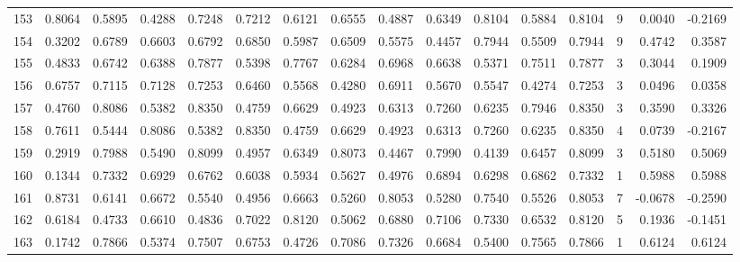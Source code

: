 \begin{tabular}{lrrrrrrrrrrrrrrr}
153 &      0.8064 &  0.5895 &  0.4288 &  0.7248 &  0.7212 &  0.6121 &  0.6555 &  0.4887 &  0.6349 &  0.8104 &   0.5884 &     0.8104 &      9 &                    0.0040 &                    -0.2169 \\
154 &      0.3202 &  0.6789 &  0.6603 &  0.6792 &  0.6850 &  0.5987 &  0.6509 &  0.5575 &  0.4457 &  0.7944 &   0.5509 &     0.7944 &      9 &                    0.4742 &                     0.3587 \\
155 &      0.4833 &  0.6742 &  0.6388 &  0.7877 &  0.5398 &  0.7767 &  0.6284 &  0.6968 &  0.6638 &  0.5371 &   0.7511 &     0.7877 &      3 &                    0.3044 &                     0.1909 \\
156 &      0.6757 &  0.7115 &  0.7128 &  0.7253 &  0.6460 &  0.5568 &  0.4280 &  0.6911 &  0.5670 &  0.5547 &   0.4274 &     0.7253 &      3 &                    0.0496 &                     0.0358 \\
157 &      0.4760 &  0.8086 &  0.5382 &  0.8350 &  0.4759 &  0.6629 &  0.4923 &  0.6313 &  0.7260 &  0.6235 &   0.7946 &     0.8350 &      3 &                    0.3590 &                     0.3326 \\
158 &      0.7611 &  0.5444 &  0.8086 &  0.5382 &  0.8350 &  0.4759 &  0.6629 &  0.4923 &  0.6313 &  0.7260 &   0.6235 &     0.8350 &      4 &                    0.0739 &                    -0.2167 \\
159 &      0.2919 &  0.7988 &  0.5490 &  0.8099 &  0.4957 &  0.6349 &  0.8073 &  0.4467 &  0.7990 &  0.4139 &   0.6457 &     0.8099 &      3 &                    0.5180 &                     0.5069 \\
160 &      0.1344 &  0.7332 &  0.6929 &  0.6762 &  0.6038 &  0.5934 &  0.5627 &  0.4976 &  0.6894 &  0.6298 &   0.6862 &     0.7332 &      1 &                    0.5988 &                     0.5988 \\
161 &      0.8731 &  0.6141 &  0.6672 &  0.5540 &  0.4956 &  0.6663 &  0.5260 &  0.8053 &  0.5280 &  0.7540 &   0.5526 &     0.8053 &      7 &                   -0.0678 &                    -0.2590 \\
162 &      0.6184 &  0.4733 &  0.6610 &  0.4836 &  0.7022 &  0.8120 &  0.5062 &  0.6880 &  0.7106 &  0.7330 &   0.6532 &     0.8120 &      5 &                    0.1936 &                    -0.1451 \\
163 &      0.1742 &  0.7866 &  0.5374 &  0.7507 &  0.6753 &  0.4726 &  0.7086 &  0.7326 &  0.6684 &  0.5400 &   0.7565 &     0.7866 &      1 &                    0.6124 &                     0.6124 \\

\end{tabular}
